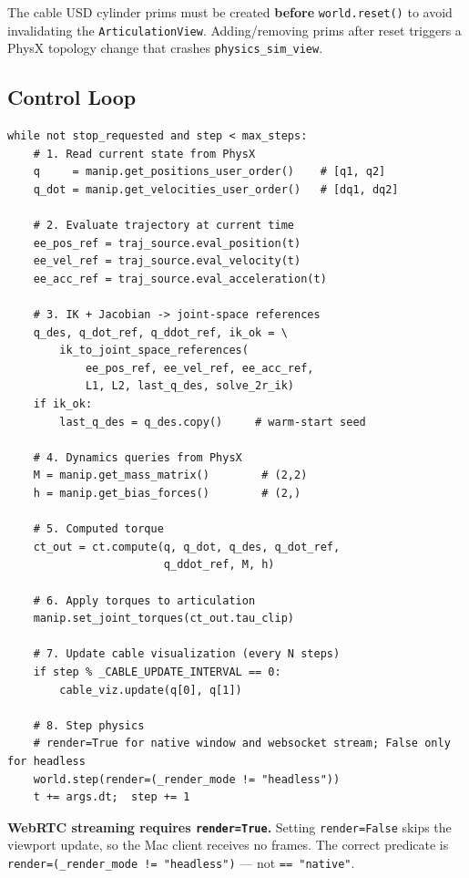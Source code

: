 \documentclass[11pt,a4paper]{article}
\begin{document}
\begin{warnbox}
The cable USD cylinder prims must be created \textbf{before} \texttt{world.reset()} to avoid invalidating the \texttt{ArticulationView}. Adding/removing prims after reset triggers a PhysX topology change that crashes \texttt{physics\_sim\_view}.
\end{warnbox}

\subsection{Control Loop}

\begin{lstlisting}[caption={Main simulation loop.}]
while not stop_requested and step < max_steps:
    # 1. Read current state from PhysX
    q     = manip.get_positions_user_order()    # [q1, q2]
    q_dot = manip.get_velocities_user_order()   # [dq1, dq2]

    # 2. Evaluate trajectory at current time
    ee_pos_ref = traj_source.eval_position(t)
    ee_vel_ref = traj_source.eval_velocity(t)
    ee_acc_ref = traj_source.eval_acceleration(t)

    # 3. IK + Jacobian -> joint-space references
    q_des, q_dot_ref, q_ddot_ref, ik_ok = \
        ik_to_joint_space_references(
            ee_pos_ref, ee_vel_ref, ee_acc_ref,
            L1, L2, last_q_des, solve_2r_ik)
    if ik_ok:
        last_q_des = q_des.copy()     # warm-start seed

    # 4. Dynamics queries from PhysX
    M = manip.get_mass_matrix()        # (2,2)
    h = manip.get_bias_forces()        # (2,)

    # 5. Computed torque
    ct_out = ct.compute(q, q_dot, q_des, q_dot_ref,
                        q_ddot_ref, M, h)

    # 6. Apply torques to articulation
    manip.set_joint_torques(ct_out.tau_clip)

    # 7. Update cable visualization (every N steps)
    if step % _CABLE_UPDATE_INTERVAL == 0:
        cable_viz.update(q[0], q[1])

    # 8. Step physics
    # render=True for native window and websocket stream; False only for headless
    world.step(render=(_render_mode != "headless"))
    t += args.dt;  step += 1
\end{lstlisting}

\begin{warnbox}
\textbf{WebRTC streaming requires \texttt{render=True}.} Setting \texttt{render=False} skips the viewport update, so the Mac client receives no frames. The correct predicate is \texttt{render=(\_render\_mode != "headless")} --- not \texttt{== "native"}.
\end{warnbox}
\end{document}
